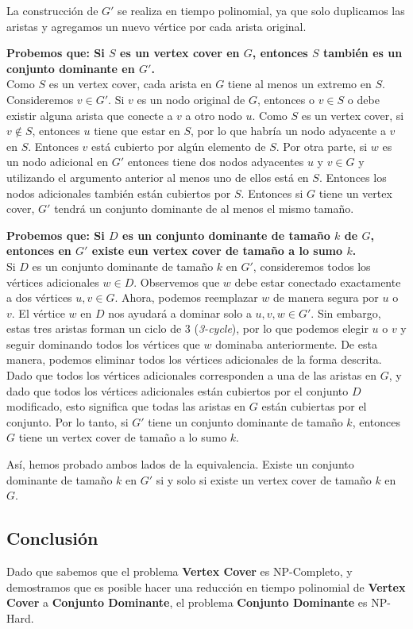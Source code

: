 \documentclass[a4paper,12pt]{article}
\begin{document}
La construcci\'on de $G'$ se realiza en tiempo polinomial, ya que solo duplicamos las aristas y agregamos un nuevo v\'ertice por cada arista original.

\textbf{Probemos que: Si $S$ es un vertex cover en $G$, entonces $S$ tambi\'en es un conjunto dominante en $G'$.}\\
    Como $S$ es un vertex cover, cada arista en $G$ tiene al menos un extremo en $S$. Consideremos $v \in G'$. Si $v$ es un nodo original de $G$, entonces
    o $v \in S$ o debe existir alguna arista que conecte a $v$ a otro nodo $u$. Como $S$ es un vertex cover, si $v \notin S$, entonces $u$ tiene que estar en $S$, por lo que habría un nodo adyacente a $v$ en $S$. Entonces $v$ está cubierto por algún elemento de $S$.
    Por otra parte, si $w$ es un nodo adicional en $G'$ entonces tiene dos nodos adyacentes $u$ y $v \in G$ y utilizando el argumento anterior al menos uno de ellos está en $S$.
    Entonces los nodos adicionales también están cubiertos por $S$. Entonces si $G$ tiene un vertex cover, $G'$ tendrá un conjunto dominante de al menos el mismo tamaño.
    

\textbf{Probemos que: Si $D$ es un conjunto dominante de tamaño $k$ de $G$, entonces en $G'$ existe eun vertex cover de tamaño a lo sumo $k$.} \\
Si $D$ es un conjunto dominante de tamaño $k$ en $G'$, consideremos todos los vértices adicionales $w \in D$. 
Observemos que $w$ debe estar conectado exactamente a dos vértices $u,v \in G$.
Ahora, podemos reemplazar $w$ de manera segura por $u$ o $v$. El vértice $w$ en $D$ nos ayudará a dominar solo a $u, v, w \in G'$.
Sin embargo, estas tres aristas forman un ciclo de 3 (\textit{3-cycle}), por lo que podemos elegir $u$ o $v$ y seguir dominando todos los vértices que $w$ dominaba anteriormente. 
De esta manera, podemos eliminar todos los vértices adicionales de la forma descrita. 
Dado que todos los vértices adicionales corresponden a una de las aristas en $G$, y dado que todos los vértices adicionales están cubiertos por el conjunto $D$ modificado, esto significa que todas las aristas en $G$ están cubiertas por el conjunto.
Por lo tanto, si $G'$ tiene un conjunto dominante de tamaño $k$, entonces $G$ tiene un vertex cover de tamaño a lo sumo $k$.



Así, hemos probado ambos lados de la equivalencia. Existe un conjunto dominante de tamaño $k$ en $G'$ si y solo si existe un vertex cover de tamaño $k$ en $G$. 

\subsection{Conclusión}
Dado que sabemos que el problema \textbf{Vertex Cover} es NP-Completo, y demostramos que es posible hacer una reducción en tiempo polinomial de \textbf{Vertex Cover} a \textbf{Conjunto Dominante}, el problema \textbf{Conjunto Dominante} es NP-Hard.
\end{document}
